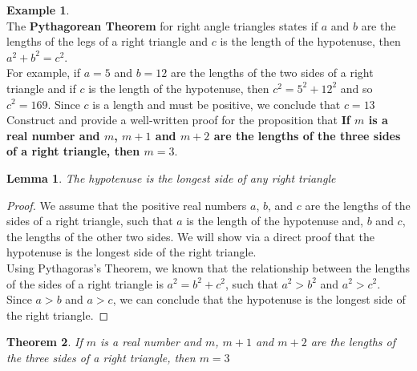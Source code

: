 \documentclass{book}
\newtheorem{theorem}{Theorem}[section]
\newtheorem{lemma}[theorem]{Lemma}
\theoremstyle{definition}
\newtheorem{example}{Example}[definition]
\theoremstyle{remark}
\begin{document}
\begin{example}
\cite[Chap.1, P.C.1.11]{ted} \\

The {\bf Pythagorean Theorem} for right angle triangles states if $a$ and $b$ are the lengths of the legs of a right triangle and $c$ is the length of the hypotenuse, then $a^2 + b^2 = c^2$. \\
For example, if $a=5$ and $b=12$ are the lengths of the two sides of a right triangle and if $c$ is the length of the hypotenuse, then $c^2 = 5^2 + 12^2$ and so $c^2=169$. Since $c$ is a length and must be positive, we conclude that $c=13$ \\

Construct and provide a well-written proof for the proposition that { \bf If $m$ is a real number and $m$, $m+1$ and $m+2$ are the lengths of the three sides of a right triangle, then $m=3$}.\\ 


\begin{tcolorbox}
	\begin{lemma}
		The hypotenuse is the longest side of any right triangle
	\end{lemma}
\end{tcolorbox}

\begin{proof}
    We assume that the positive real numbers $a$, $b$, and $c$ are the lengths of the sides of a right triangle, such that $a$ is the length of the hypotenuse and, $b$ and $c$, the lengths of the other two sides. We will show via a direct proof that the hypotenuse is the longest side of the right triangle. \\
    
    Using Pythagoras's Theorem, we known that the relationship between the lengths of the sides of a right triangle is $a^2 = b^2 + c^2$, such that $a^2 > b^2$ and $a^2 > c^2$. \\ 
    
    Since $a > b$ and $a > c$, we can conclude that the hypotenuse is the longest side of the right triangle. 
\end{proof}

\begin{tcolorbox}
	\begin{theorem}
		If $m$ is a real number and $m$, $m+1$ and $m+2$ are the lengths of the three sides of a right triangle, then $m=3$
	\end{theorem}
\end{tcolorbox}


\end{example}
\end{document}
